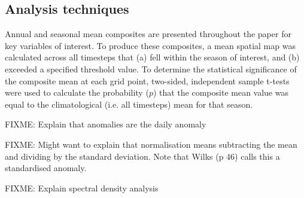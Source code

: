 \subsection{Analysis techniques}

Annual and seasonal mean composites are presented throughout the paper for key variables of interest. To produce these composites, a mean spatial map was calculated across all timesteps that (a) fell within the season of interest, and (b) exceeded a specified threshold value. To determine the statistical significance of the composite mean at each grid point, two-sided, independent sample t-tests were used to calculate the probability ($p$) that the composite mean value was equal to the climatological (i.e. all timesteps) mean for that season.    

FIXME: Explain that anomalies are the daily anomaly

FIXME: Might want to explain that normalisation means subtracting the mean and dividing by the standard deviation. Note that Wilks (p 46) calls this a standardised anomaly.

FIXME: Explain spectral density analysis